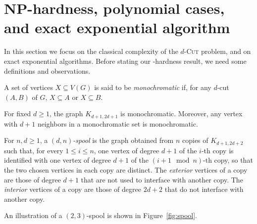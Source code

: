 \section{NP-hardness, polynomial cases, and exact exponential algorithm}
\label{sec:np}

In this section we focus on the classical complexity of the \textsc{$d$-Cut} problem, and on exact exponential algorithms. 
Before stating our \NP-hardness result, we need some definitions and observations.

\begin{definition}
    A set of vertices $X \subseteq V(G)$ is said to be \emph{monochromatic} if, for any $d$-cut $(A, B)$ of $G$, $X \subseteq A$ or $X \subseteq B$.
\end{definition}

\begin{observation}
    \label{obs:mono_bipartite}
    For fixed $d \geq 1$, the graph $K_{d+1, 2d+1}$ is monochromatic.
    Moreover, any vertex with $d+1$ neighbors in a monochromatic set is monochromatic.
\end{observation}

\begin{definition}[Spool]
    For $n,d \geq 1$, a \emph{$(d, n)$-spool}  is the graph obtained from $n$  copies of $K_{d+1, 2d+2}$ such that, for every $1 \leq i \leq n$, one vertex of degree $d+1$ of the $i$-th copy is identified with one vertex of degree $d+1$ of the $(i+1 \mod n)$-th copy, so that the two chosen vertices in each copy are distinct. %
    The \emph{exterior} vertices of a copy are those of degree $d+1$ that are not used to interface with another copy.
    The \emph{interior} vertices of a copy are those of degree $2d+2$ that do not interface with another copy.
\end{definition}

An illustration of a $(2,3)$-spool is shown in Figure~\ref{fig:spool}.

